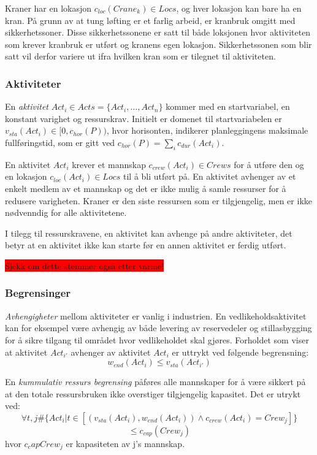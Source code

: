 Kraner har en lokasjon $ c_{loc}(Crane_{k}) \in Locs $, og hver lokasjon kan bare ha en kran. På grunn av at tung løfting er et farlig arbeid, er kranbruk omgitt med sikkerhetssoner. Disse sikkerhetssonene er satt til både loksjonen hvor aktiviteten som krever kranbruk er utført og kranens egen lokasjon. Sikkerhetssonen som blir satt vil derfor variere ut ifra hvilken kran som er tilegnet til aktiviteten.

\subsubsection{Aktiviteter}
En \textit{aktivitet} $ Act_{i} \in Acts = \{ Act_{i},\dots,Act_{n} \} $ kommer med en startvariabel, en konstant varighet og ressurskrav. Initielt er domenet til startvariabelen er $ v_{sta}(Act_{i}) \in [ 0, c_{hor}(P)) $, hvor horisonten, indikerer planleggingens maksimale fullføringstid, som er gitt ved $ c_{hor}(P) = \sum_{i} c_{dur}(Act_{i}) $.

En aktivitet $ Act_{i} $ krever et mannskap $ c_{crew}(Act_{i}) \in Crews $ for å utføre den og en lokasjon $ c_{loc}(Act_{i}) \in Locs $ til å bli utført på. En aktivitet avhenger av et enkelt medlem av et mannskap og det er ikke mulig å samle ressurser for å redusere varigheten. Kraner er den siste ressursen som er tilgjengelig, men er ikke nødvenndig for alle aktivitetene.

I tilegg til ressurskravene, en aktivitet kan avhenge på andre aktiviteter, det betyr at en aktivitet ikke kan starte før en annen aktivitet er ferdig utført.

\colorbox{red}{Sjekk om dette stemmer også etter varme!}

\subsubsection{Begrensinger}
\textit{Avhengigheter} mellom aktiviteter er vanlig i industrien. En vedlikeholdsaktivitet kan for eksempel være avhengig av både levering av reservedeler og stillasbygging for å sikre tilgang til området hvor vedlikeholdet skal gjøres. Forholdet som viser at aktivitet $ Act_{i'} $ avhenger av aktivitet $ Act_{i} $ er uttrykt ved følgende begrensning: \[ w_{end}(Act_{i}) \leq v_{sta}(Act_{i'}) \]

En \textit{kummulativ ressurs begrensing} påføres alle mannskaper for å være sikkert på at den totale ressursbruken ikke overstiger tilgjengelig kapasitet. Det er utrykt ved: \[ \forall t,j \# \{ Act_{i} | t \in [(v_{sta}(Act_{i}), w_{end}(Act_{i})) \wedge c_{crew}(Act_{i}) = Crew_{j}] \} \] \[ \leq c_{cap}(Crew_{j}) \] hvor $ c_cap{Crew_{j}} $ er kapasiteten av j's mannskap.

